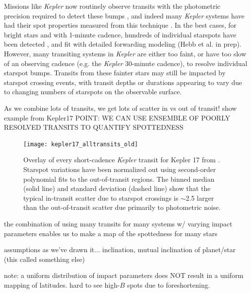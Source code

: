 \documentclass[preprint2]{aastex62}
\newcommand{\Kepler}{\textsl{Kepler}\xspace}
\begin{document}
Missions like \Kepler now routinely observe transits with the photometric precision required to detect these bumps \citep{borucki2010}, and indeed many \Kepler systems have had their spot properties measured from this technique \citep[e.g.][]{sanchis-ojeda2011, sanchis-ojeda2013}. In the best cases, for bright stars and with 1-minute cadence, hundreds of individual starspots have been detected \citep[e.g.][]{davenport_phd}, and fit with detailed forwarding modeling (Hebb et al. in prep). However, many transiting systems in \Kepler are either too faint, or have too slow of an observing cadence (e.g. the \Kepler 30-minute cadence), to resolve individual starspot bumps. Transits from these fainter stars may still be impacted by starspot crossing events, with transit depths or durations appearing to vary due to changing numbers of starspots on the observable surface.



As we combine lots of transits, we get lots of scatter in vs out of transit!
show example from Kepler17
POINT: WE CAN USE ENSEMBLE OF POORLY RESOLVED TRANSITS TO QUANTIFY SPOTTEDNESS


\begin{figure}[!t]
\centering
\texttt{[image: kepler17\_alltransits\_old]}
\caption{
Overlay of every short-cadence \Kepler transit for Kepler 17 from \citet{davenport_phd}. Starspot variations have been normalized out using second-order polynomial fits to the out-of-transit regions. The binned median (solid line) and standard deviation (dashed line) show that the typical in-transit scatter due to starspot crossings is $\sim$2.5 larger than the out-of-transit scatter due primarily to photometric noise.
}
\label{fig:kep17}
\end{figure}




the combination of using many transits for many systems w/ varying impact parameters enables us to make a map of the spottedness for many stars

assumptions as we've drawn it... inclination, mutual inclination of planet/star (this called something else)

note: a uniform distribution of impact parameters does NOT result in a uniform mapping of latitudes. hard to see high-$B$ spots due to foreshortening.

\end{document}
